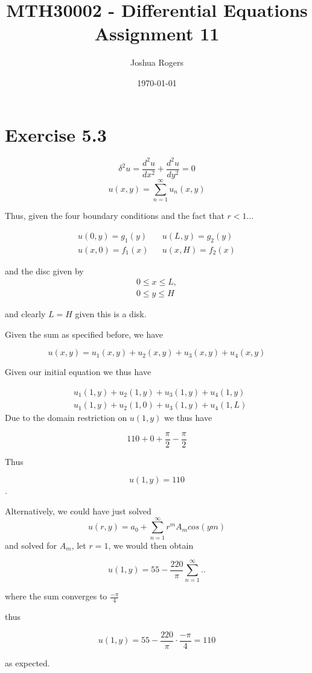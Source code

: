 \documentclass{article}
\title{\vspace{-4cm}MTH30002 - Differential Equations Assignment 11}
\author{Joshua Rogers}
\date\today
\begin{document}
\maketitle

\section*{Exercise 5.3}

$$\delta^2u = \frac{d^2u}{dx^2} + \frac{d^2u}{dy^2} = 0$$
$$u(x,y) = \sum_{n=1}^{\infty} u_n(x,y)$$


Thus, given the four boundary conditions and the fact that $r<1$...

\begin{align*}
u(0,y) = g_1(y) && u(L,y) = g_2(y)\\
u(x,0) = f_1(x) && u(x,H) = f_2(x)
\end{align*}

and the disc given by
\begin{align*}
0\leq x \leq L,\\
0 \leq y \leq H
\end{align*}

and clearly $L=H$ given this is a disk.


Given the sum as specified before, we have 

$$u(x,y) = u_1(x,y) + u_2(x,y) + u_3(x,y) + u_4(x,y)$$

Given our initial equation we thus have

\begin{align*}
&u_1(1,y) + u_2(1,y) + u_3(1,y) + u_4(1,y) \\
&u_1(1,y) + u_2(1,0) + u_3(1,y) + u_4(1,L)
\end{align*}
Due to the domain restriction on $u(1,y)$ we thus have

$$110 + 0 + \frac{\pi}{2} - \frac{\pi}{2}$$

Thus

$$u(1,y) = 110$$.


Alternatively, we could have just solved
$$u(r,y) = a_0 + \sum_{n=1}^{\infty} r^m A_m cos\left(ym\right)$$
and solved for $A_m$, let $r=1$, we would then obtain

$$u(1,y) = 55 - \frac{220}{\pi} \sum_{n=1}^{\infty} ..$$

where the sum converges to $\frac{-\pi}{4}$

thus

$$u(1,y) = 55 - \frac{220}{\pi} \cdot \frac{-\pi}{4} = 110$$

as expected.
\end{document}
